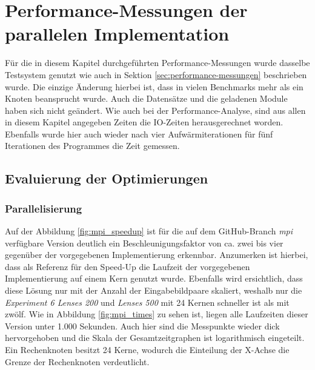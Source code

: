 \chapter{Performance-Messungen der parallelen Implementation}

Für die in diesem Kapitel durchgeführten Performance-Messungen wurde dasselbe Testsystem genutzt wie auch in Sektion \ref{sec:performance-messungen} beschrieben wurde. Die einzige Änderung hierbei ist, dass in vielen Benchmarks mehr als ein Knoten beansprucht wurde. Auch die Datensätze und die geladenen Module haben sich nicht geändert. Wie auch bei der Performance-Analyse, sind aus allen in diesem Kapitel angegeben Zeiten die \gls{IO}-Zeiten herausgerechnet worden. Ebenfalls wurde hier auch wieder nach vier Aufwärmiterationen für fünf Iterationen des Programmes die Zeit gemessen. 

\section{Evaluierung der Optimierungen}

\subsection{Parallelisierung}

Auf der Abbildung \ref{fig:mpi_speedup} ist für die auf dem GitHub-Branch \textit{mpi} verfügbare Version \cite{CBS18} deutlich ein Beschleunigungsfaktor von ca. zwei bis vier gegenüber der vorgegebenen Implementierung erkennbar. Anzumerken ist hierbei, dass als Referenz für den Speed-Up die Laufzeit der vorgegebenen Implementierung auf einem Kern genutzt wurde. Ebenfalls wird ersichtlich, dass diese Lösung nur mit der Anzahl der Eingabebildpaare skaliert, weshalb nur die \textit{Experiment 6 Lenses 200} und \textit{Lenses 500} mit 24 Kernen schneller ist als mit zwölf. Wie in Abbildung \ref{fig:mpi_times} zu sehen ist, liegen alle Laufzeiten dieser Version unter 1.000 Sekunden. Auch hier sind die Messpunkte wieder dick hervorgehoben und die Skala der Gesamtzeitgraphen ist logarithmisch eingeteilt. Ein Rechenknoten besitzt 24 Kerne, wodurch die Einteilung der X-Achse die Grenze der Rechenknoten verdeutlicht. 

